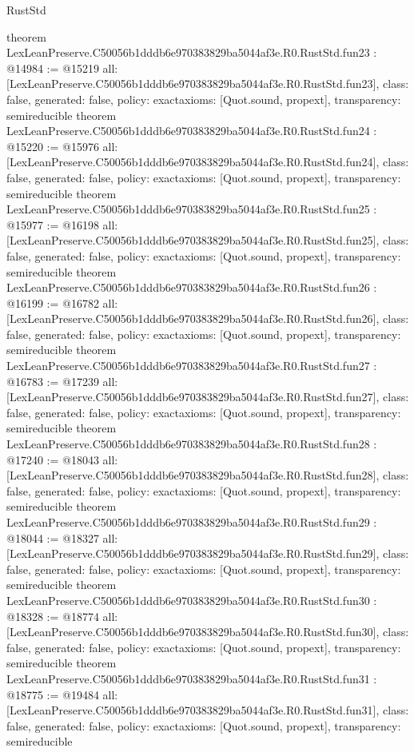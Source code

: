 \begin{lexlean}{RustStd}
\begin{coremodule}
{}
theorem LexLeanPreserve.C50056b1dddb6e970383829ba5044af3e.R0.RustStd.fun23 : @14984 := @15219 {
  all: [LexLeanPreserve.C50056b1dddb6e970383829ba5044af3e.R0.RustStd.fun23],
  class: false,
  generated: false,
  policy: exact{axioms: [Quot.sound, propext]},
  transparency: semireducible
}
theorem LexLeanPreserve.C50056b1dddb6e970383829ba5044af3e.R0.RustStd.fun24 : @15220 := @15976 {
  all: [LexLeanPreserve.C50056b1dddb6e970383829ba5044af3e.R0.RustStd.fun24],
  class: false,
  generated: false,
  policy: exact{axioms: [Quot.sound, propext]},
  transparency: semireducible
}
theorem LexLeanPreserve.C50056b1dddb6e970383829ba5044af3e.R0.RustStd.fun25 : @15977 := @16198 {
  all: [LexLeanPreserve.C50056b1dddb6e970383829ba5044af3e.R0.RustStd.fun25],
  class: false,
  generated: false,
  policy: exact{axioms: [Quot.sound, propext]},
  transparency: semireducible
}
theorem LexLeanPreserve.C50056b1dddb6e970383829ba5044af3e.R0.RustStd.fun26 : @16199 := @16782 {
  all: [LexLeanPreserve.C50056b1dddb6e970383829ba5044af3e.R0.RustStd.fun26],
  class: false,
  generated: false,
  policy: exact{axioms: [Quot.sound, propext]},
  transparency: semireducible
}
theorem LexLeanPreserve.C50056b1dddb6e970383829ba5044af3e.R0.RustStd.fun27 : @16783 := @17239 {
  all: [LexLeanPreserve.C50056b1dddb6e970383829ba5044af3e.R0.RustStd.fun27],
  class: false,
  generated: false,
  policy: exact{axioms: [Quot.sound, propext]},
  transparency: semireducible
}
theorem LexLeanPreserve.C50056b1dddb6e970383829ba5044af3e.R0.RustStd.fun28 : @17240 := @18043 {
  all: [LexLeanPreserve.C50056b1dddb6e970383829ba5044af3e.R0.RustStd.fun28],
  class: false,
  generated: false,
  policy: exact{axioms: [Quot.sound, propext]},
  transparency: semireducible
}
theorem LexLeanPreserve.C50056b1dddb6e970383829ba5044af3e.R0.RustStd.fun29 : @18044 := @18327 {
  all: [LexLeanPreserve.C50056b1dddb6e970383829ba5044af3e.R0.RustStd.fun29],
  class: false,
  generated: false,
  policy: exact{axioms: [Quot.sound, propext]},
  transparency: semireducible
}
theorem LexLeanPreserve.C50056b1dddb6e970383829ba5044af3e.R0.RustStd.fun30 : @18328 := @18774 {
  all: [LexLeanPreserve.C50056b1dddb6e970383829ba5044af3e.R0.RustStd.fun30],
  class: false,
  generated: false,
  policy: exact{axioms: [Quot.sound, propext]},
  transparency: semireducible
}
theorem LexLeanPreserve.C50056b1dddb6e970383829ba5044af3e.R0.RustStd.fun31 : @18775 := @19484 {
  all: [LexLeanPreserve.C50056b1dddb6e970383829ba5044af3e.R0.RustStd.fun31],
  class: false,
  generated: false,
  policy: exact{axioms: [Quot.sound, propext]},
  transparency: semireducible
}
\end{coremodule}
\end{lexlean}
